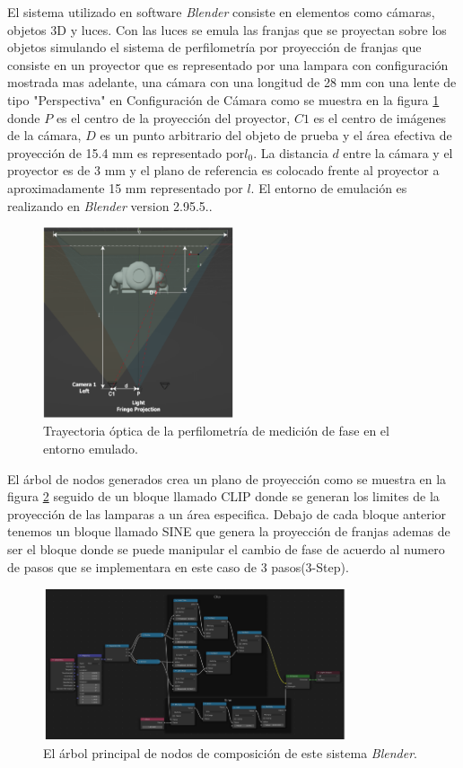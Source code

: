 \documentclass[10pt,letterpaper]{article}
\begin{document}
El sistema utilizado en software \textit{Blender} consiste en elementos como cámaras, objetos 3D y luces. Con las luces se emula las franjas que se proyectan sobre los objetos simulando el sistema de perfilometría por proyección de franjas que consiste en un proyector que es representado por una lampara con configuración mostrada mas adelante, una cámara con una longitud de 28 mm con una lente de tipo "Perspectiva" en Configuración de Cámara como se muestra en la figura \ref{tif1} donde $P$ es el centro de la proyección del proyector, $C1$ es el centro de imágenes de la cámara, $D$ es un punto arbitrario del objeto de prueba y el área efectiva de proyección de 15.4 mm es representado por$l_0$. La distancia $d$ entre la cámara y el proyector es de 3 mm y el plano de referencia es colocado frente al proyector a aproximadamente 15 mm representado por $l$. El entorno de emulación es realizando en \textit{Blender} version 2.95.5.\cite{Mart:Suar}. 

\begin{figure}[H]
	\centering
    \includegraphics[width=0.5\textwidth]{tifs/tif1.png}
    \caption{Trayectoria óptica de la perfilometría de medición de fase en el entorno emulado.}
    \label{tif1}
\end{figure}

El árbol de nodos generados crea un plano de proyección como se muestra en la figura \ref{tif2} seguido de un bloque llamado CLIP donde se generan los limites de la proyección de las lamparas a un área especifica. Debajo de cada bloque anterior tenemos un bloque llamado SINE que genera la proyección de franjas ademas de ser el bloque donde se puede manipular el cambio de fase de acuerdo al numero de pasos que se implementara en este caso de 3 pasos(3-Step).

\begin{figure}[H]
	\centering
    \includegraphics[width=0.8\textwidth]{tifs/tif2.png}
    \caption{El árbol principal de nodos de composición de este sistema \textit{Blender}.}
    \label{tif2}
\end{figure}
\end{document}
